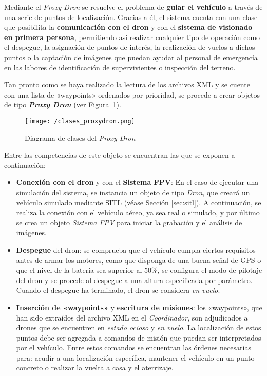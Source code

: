 Mediante el \textit{Proxy Dron} se resuelve el problema de \textbf{guiar el vehículo} a través de una serie de puntos de localización. Gracias a él, el sistema cuenta con una clase que posibilita la \textbf{comunicación con el dron} y con el \textbf{sistema de visionado en primera persona}, permitiendo así realizar cualquier tipo de operación como el despegue, la asignación de puntos de interés, la realización de vuelos a dichos puntos o la captación de imágenes que puedan ayudar al personal de emergencia en las labores de identificación de supervivientes o inspección del terreno.

Tan pronto como se haya realizado la lectura de los archivos XML y se cuente con una lista de «waypoints» ordenados por prioridad, se procede a crear objetos de tipo \textbf{\textit{Proxy Dron}} (ver Figura~\ref{fig:diagclasesproxy}). 

\begin{figure}[!h]
\begin{center}
\texttt{[image: /clases\_proxydron.png]}
\caption[Diagrama de clases del \textit{Proxy Dron}]{Diagrama de clases del \textit{Proxy Dron}}
\label{fig:diagclasesproxy}
\end{center}
\end{figure}

Entre las competencias de este objeto se encuentran las que se exponen a continuación:

\begin{itemize}
\item \textbf{Conexión con el dron} y con el \textbf{Sistema \acs{FPV}}: En el caso de ejecutar una simulación del sistema, se instancia un objeto de tipo \textit{Dron}, que creará un vehículo simulado mediante \acs{SITL} (véase Sección \ref{sec:sitl}). A continuación, se realiza la conexión con el vehículo aéreo, ya sea real o simulado, y por último se crea un objeto \textit{Sistema \acs{FPV}} para iniciar la grabación y el análisis de imágenes.
\item \textbf{Despegue} del dron: se comprueba que el vehículo cumpla ciertos requisitos antes de armar los motores, como que disponga de una buena señal de \acs{GPS} o que el nivel de la batería sea superior al 50\%, se configura el modo de pilotaje del dron y se procede al despegue a una altura especificada por parámetro. Cuando el despegue ha terminado, el dron se considera \textit{en vuelo}. 
\item \textbf{Inserción de «waypoints»} y \textbf{escritura de misiones}: los «waypoints», que han sido extraídos del archivo XML en el \textit{Coordinador}, son adjudicados a drones que se encuentren en \textit{estado ocioso} y \textit{en vuelo}. La localización de estos puntos debe ser agregada a comandos de misión que puedan ser interpretados por el vehículo. Entre estos comandos se encuentran las órdenes necesarias para: acudir a una localización específica, mantener el vehículo en un punto concreto o realizar la vuelta a casa y el aterrizaje.
\end{itemize}

